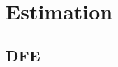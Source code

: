 \documentclass[../../note.tex]{subfiles}
\begin{document}
\chapter{Estimation}
\section{DFE}
\end{document}
